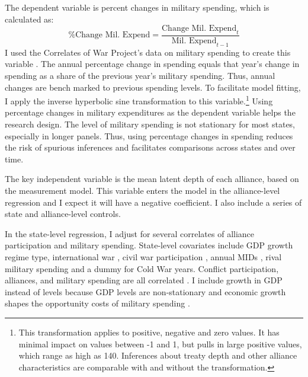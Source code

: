\documentclass[12pt]{article}
\begin{document}
The dependent variable is percent changes in military spending, which is calculated as:
\begin{equation}
\mbox{\% Change Mil. Expend} = \frac{ \mbox{Change Mil. Expend}_t }{ \mbox{Mil. Expend}_{t-1} }
\end{equation} 
I used the Correlates of War Project's data on military spending to create this variable \citep{SingerCINC1988}.
The annual percentage change in spending equals that year's change in spending as a share of the previous year's military spending.
Thus, annual changes are bench marked to previous spending levels. 
To facilitate model fitting, I apply the inverse hyperbolic sine transformation to this variable.\footnote{This transformation applies to positive, negative and zero values. It has minimal impact on values between -1 and 1, but pulls in large positive values, which range as high as 140. Inferences about treaty depth and other alliance characteristics are comparable with and without the transformation.}
Using percentage changes in military expenditures as the dependent variable helps the research design. 
The level of military spending is not stationary for most states, especially in longer panels. 
Thus, using percentage changes in spending reduces the risk of spurious inferences and facilitates comparisons across states and over time. 


The key independent variable is the mean latent depth of each alliance, based on the measurement model. 
This variable enters the model in the alliance-level regression and I expect it will have a negative coefficient. 
I also include a series of state and alliance-level controls.


In the state-level regression, I adjust for several correlates of alliance participation and military spending. 
State-level covariates include GDP growth \citep{Boltetal2018} regime type, international war \citep{Reiteretal2016}, civil war participation \citep{SarkeesWayman2010}, annual MIDs \citep{Gibleretal2016}, rival military spending \citep{ThompsonDreyer2012} and a dummy for Cold War years.
Conflict participation, alliances, and military spending are all correlated \citep{SeneseVasquez2008}.
I include growth in GDP instead of levels because GDP levels are non-stationary and economic growth shapes the opportunity costs of military spending \citep{Kimball2010, Zielinskietal2017}.  
\end{document}
